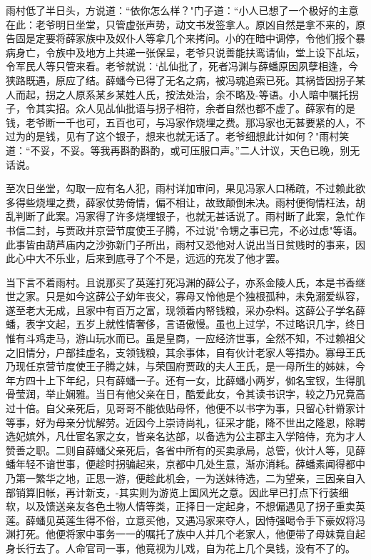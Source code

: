 雨村低了半日头，方说道：“依你怎么样？"门子道：“小人已想了一个极好的主意在此：老爷明日坐堂，只管虚张声势，动文书发签拿人。原凶自然是拿不来的，原告固是定要将薛家族中及奴仆人等拿几个来拷问。小的在暗中调停，令他们报个暴病身亡，令族中及地方上共递一张保呈，老爷只说善能扶鸾请仙，堂上设下乩坛，令军民人等只管来看。老爷就说：`乩仙批了，死者冯渊与薛蟠原因夙孽相逢，今狭路既遇，原应了结。薛蟠今已得了无名之病，被冯魂追索已死。其祸皆因拐子某人而起，拐之人原系某乡某姓人氏，按法处治，余不略及-等语。小人暗中嘱托拐子，令其实招。众人见乩仙批语与拐子相符，余者自然也都不虚了。薛家有的是钱，老爷断一千也可，五百也可，与冯家作烧埋之费。那冯家也无甚要紧的人，不过为的是钱，见有了这个银子，想来也就无话了。老爷细想此计如何？"雨村笑道：“不妥，不妥。等我再斟酌斟酌，或可压服口声。”二人计议，天色已晚，别无话说。

至次日坐堂，勾取一应有名人犯，雨村详加审问，果见冯家人口稀疏，不过赖此欲多得些烧埋之费，薛家仗势倚情，偏不相让，故致颠倒未决。雨村便徇情枉法，胡乱判断了此案。冯家得了许多烧埋银子，也就无甚话说了。雨村断了此案，急忙作书信二封，与贾政并京营节度使王子腾，不过说"令甥之事已完，不必过虑"等语。此事皆由葫芦庙内之沙弥新门子所出，雨村又恐他对人说出当日贫贱时的事来，因此心中大不乐业，后来到底寻了个不是，远远的充发了他才罢。

当下言不着雨村。且说那买了英莲打死冯渊的薛公子，亦系金陵人氏，本是书香继世之家。只是如今这薛公子幼年丧父，寡母又怜他是个独根孤种，未免溺爱纵容，遂至老大无成，且家中有百万之富，现领着内帑钱粮，采办杂料。这薛公子学名薛蟠，表字文起，五岁上就性情奢侈，言语傲慢。虽也上过学，不过略识几字，终日惟有斗鸡走马，游山玩水而已。虽是皇商，一应经济世事，全然不知，不过赖祖父之旧情分，户部挂虚名，支领钱粮，其余事体，自有伙计老家人等措办。寡母王氏乃现任京营节度使王子腾之妹，与荣国府贾政的夫人王氏，是一母所生的姊妹，今年方四十上下年纪，只有薛蟠一子。还有一女，比薛蟠小两岁，侞名宝钗，生得肌骨莹润，举止娴雅。当日有他父亲在日，酷爱此女，令其读书识字，较之乃兄竟高过十倍。自父亲死后，见哥哥不能依贴母怀，他便不以书字为事，只留心针黹家计等事，好为母亲分忧解劳。近因今上崇诗尚礼，征采才能，降不世出之隆恩，除聘选妃嫔外，凡仕宦名家之女，皆亲名达部，以备选为公主郡主入学陪侍，充为才人赞善之职。二则自薛蟠父亲死后，各省中所有的买卖承局，总管，伙计人等，见薛蟠年轻不谙世事，便趁时拐骗起来，京都中几处生意，渐亦消耗。薛蟠素闻得都中乃第一繁华之地，正思一游，便趁此机会，一为送妹待选，二为望亲，三因亲自入部销算旧帐，再计新支，-其实则为游览上国风光之意。因此早已打点下行装细软，以及馈送亲友各色土物人情等类，正择日一定起身，不想偏遇见了拐子重卖英莲。薛蟠见英莲生得不俗，立意买他，又遇冯家来夺人，因恃强喝令手下豪奴将冯渊打死。他便将家中事务一一的嘱托了族中人并几个老家人，他便带了母妹竟自起身长行去了。人命官司一事，他竟视为儿戏，自为花上几个臭钱，没有不了的。

